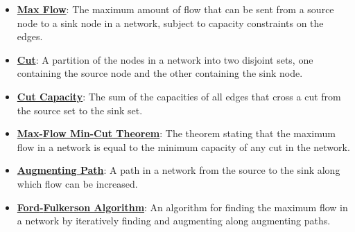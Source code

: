 \documentclass{article}%
\begin{document}
\begin{itemize}[leftmargin=*]%
\item \href{https://www.math.purdue.edu/~yipn/421/2024-11-19-MaxFlowMinCut.pdf#page=1}{\textbf{Max Flow}}: The maximum amount of flow that can be sent from a source node to a sink node in a network, subject to capacity constraints on the edges.%
\item \href{https://www.math.purdue.edu/~yipn/421/2024-11-19-MaxFlowMinCut.pdf#page=2}{\textbf{Cut}}: A partition of the nodes in a network into two disjoint sets, one containing the source node and the other containing the sink node.%
\item \href{https://www.math.purdue.edu/~yipn/421/2024-11-19-MaxFlowMinCut.pdf#page=2}{\textbf{Cut Capacity}}: The sum of the capacities of all edges that cross a cut from the source set to the sink set.%
\item \href{https://www.math.purdue.edu/~yipn/421/2024-11-19-MaxFlowMinCut.pdf#page=4}{\textbf{Max{-}Flow Min{-}Cut Theorem}}: The theorem stating that the maximum flow in a network is equal to the minimum capacity of any cut in the network.%
\item \href{https://www.math.purdue.edu/~yipn/421/2024-11-19-MaxFlowMinCut.pdf#page=10}{\textbf{Augmenting Path}}: A path in a network from the source to the sink along which flow can be increased.%
\item \href{https://www.math.purdue.edu/~yipn/421/2024-11-19-MaxFlowMinCut.pdf#page=10}{\textbf{Ford{-}Fulkerson Algorithm}}: An algorithm for finding the maximum flow in a network by iteratively finding and augmenting along augmenting paths.%
\end{itemize}%
\end{document}
